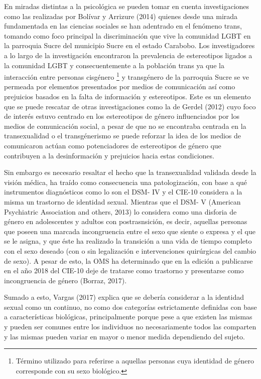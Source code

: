 En miradas distintas a la psicológica se pueden tomar en cuenta investigaciones
como las realizadas por Bolívar y Arrizure (2014) quienes desde una mirada
fundamentada en las ciencias sociales se han adentrado en el fenómeno trans,
tomando como foco principal la discriminación que vive la comunidad LGBT en la
parroquia Sucre del municipio Sucre en el estado Carabobo.
Los investigadores a lo largo de la investigación encontraron la prevalencia de
estereotipos ligados a la comunidad LGBT y consecuentemente a la población trans
ya que la interacción entre personas cisgénero
\footnote{Término utilizado para referirse a aquellas personas cuya identidad
de género corresponde con su sexo biológico.}
y transgénero de la parroquia
Sucre se ve permeada por elementos presentados por medios de comunicación así
como prejuicios basados en la falta de información y estereotipos.
Este es un elemento que se puede rescatar de otras investigaciones como la de
Gerdel (2012) cuyo foco de interés estuvo centrado en los estereotipos de género
influenciados por los medios de comunicación social, a pesar de que no se
encontraba centrada en la transexualidad o el transgénerismo se puede reforzar
la idea de los medios de comunicaron actúan como potenciadores de estereotipos
de género que contribuyen a la desinformación y prejuicios hacia estas
condiciones.

Sin embargo es necesario resaltar el hecho que la transexualidad validada desde
la visión médica, ha traído como consecuencia una patologización, con base a qué
instrumentos diagnósticos como lo son el DSM- IV y el CIE-10 considera a la
misma un trastorno de identidad sexual.
Mientras que el DSM- V (American Psychiatric Association and others, 2013) lo
considera como una disforia de género en adolescentes y adultos con
postrasnsición, es decir, aquellas personas que poseen una marcada
incongruencia entre el sexo que siente o expresa y el que se le asigna, y que
éste ha realizado la transición a una vida de tiempo completo con el sexo
deseado (con o sin legalización e intervenciones quirúrgicas del cambio de
sexo).
A pesar de esto, la OMS ha determinado que en la edición a publicarse en el año
2018 del CIE-10 deje de tratarse como trastorno y presentarse como incongruencia
de género (Borraz, 2017).

Sumado a esto, Vargas (2017) explica que se debería considerar a la identidad
sexual como un continuo, no como dos categorías estrictamente definidas con base
a características biológicas, principalmente porque pese a que existen las
mismas y pueden ser comunes entre los individuos no necesariamente todos las
comparten y las mismas pueden variar en mayor o menor medida dependiendo del
sujeto.

